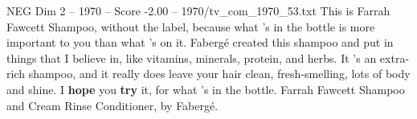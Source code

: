 \begin{textsample}{NEG Dim 2 – 1970 – Score -2.00 – 1970/tv\_com\_1970\_53.txt}  \label{ex:f2_neg_043}
This is Farrah Fawcett Shampoo, without the label, because what 's in the bottle is more important to you than what 's on it.
Fabergé created this shampoo and put in things that I believe in, like vitamins, minerals, protein, and herbs.
It 's an extra-rich shampoo, and it really does leave your hair clean, fresh-smelling, lots of body and shine.
I \textbf{hope} you \textbf{try} it, for what 's in the bottle.
Farrah Fawcett Shampoo and Cream Rinse Conditioner, by Fabergé.

\end{textsample}
